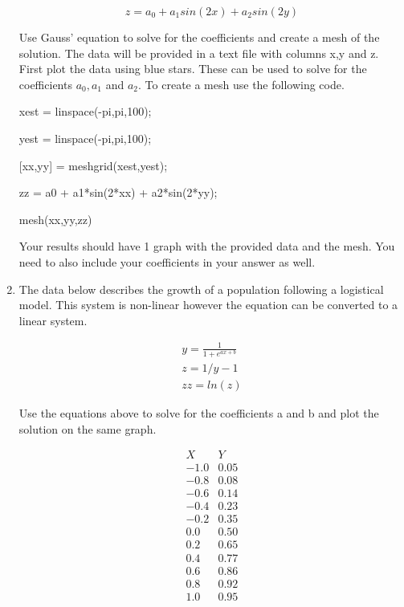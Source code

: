 \begin{enumerate}
  \begin{equation}\nonumber
    z = a_0 + a_1sin(2x) + a_2sin(2y)
  \end{equation}

  Use Gauss' equation to solve for the
  coefficients and create a mesh of the solution. The data will be
  provided in a text file with columns x,y and z. First plot the data
  using blue stars. These can be used to solve for the coefficients
  $a_0,a_1$ and $a_2$. To create a mesh use the following code. 

  \begin{framed}
    xest = linspace(-pi,pi,100); 

    yest = linspace(-pi,pi,100);

    [xx,yy] = meshgrid(xest,yest);

    zz = a0 + a1*sin(2*xx) + a2*sin(2*yy);
    
    mesh(xx,yy,zz)
  \end{framed}
  Your results should have 1 graph with the provided data and the
  mesh. You need to also include your coefficients in your answer as well.

\item The data below describes the growth of a population following a
  logistical model. This system is non-linear however the equation can
  be converted to a linear system.

  \begin{equation}\nonumber
    \begin{matrix}
    y = \frac{1}{1+e^{ax+b}} \\
    z = 1/y - 1 \\
    zz = ln(z)
    \end{matrix}
  \end{equation}

  Use the equations above to solve for the coefficients a and b and
  plot the solution on the same graph.

  \begin{equation}\nonumber
    \begin{matrix}
      X & Y \\
      -1.0 & 0.05 \\
      -0.8 & 0.08 \\
      -0.6 & 0.14 \\
      -0.4 & 0.23 \\
      -0.2 & 0.35 \\ 
      0.0 & 0.50 \\
      0.2 & 0.65 \\
      0.4 & 0.77 \\
      0.6 & 0.86 \\
      0.8 & 0.92 \\
      1.0 & 0.95
    \end{matrix}
  \end{equation}

\end{enumerate}


